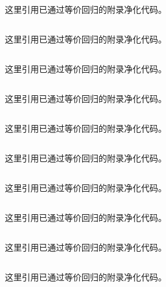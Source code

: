 \documentclass[12pt,a4paper]{article}
\begin{document}
\begin{appendices}
这里引用已通过等价回归的附录净化代码。

\subsection{}

这里引用已通过等价回归的附录净化代码。

\subsection{}

这里引用已通过等价回归的附录净化代码。

\subsection{}

这里引用已通过等价回归的附录净化代码。

\subsection{}

这里引用已通过等价回归的附录净化代码。

\subsection{}

这里引用已通过等价回归的附录净化代码。

\subsection{}

这里引用已通过等价回归的附录净化代码。

\subsection{}

这里引用已通过等价回归的附录净化代码。

\subsection{}

这里引用已通过等价回归的附录净化代码。

\subsection{}

这里引用已通过等价回归的附录净化代码。
\end{appendices}
\end{document}
